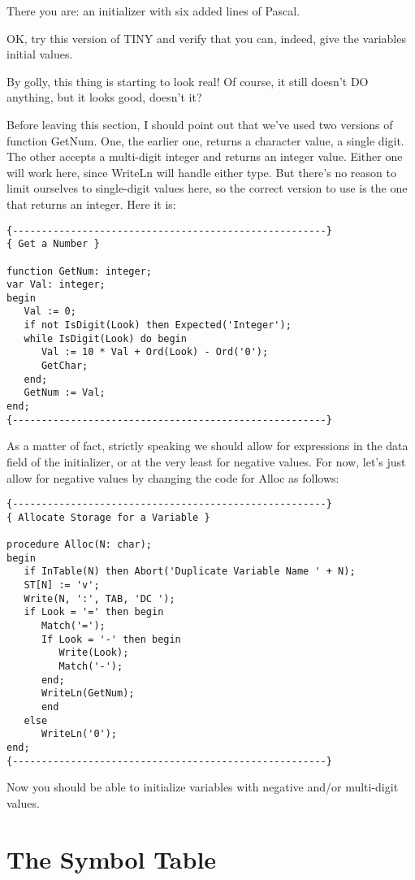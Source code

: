 There you are: an initializer with six added lines of Pascal.

OK, try this  version  of  TINY  and verify that you can, indeed, give the variables initial values.

By golly, this thing is starting to look  real!    Of  course, it still doesn't DO anything, but it looks good, doesn't it?

Before leaving this section, I should point out  that  we've used two versions of function GetNum. One, the earlier one, returns a character value, a single digit. The other accepts a multi-digit integer and returns an integer value. Either one will work here, since WriteLn will handle either type. But there's no  reason to limit ourselves  to  single-digit  values  here, so  the correct version to use is the one that returns an integer. Here it is:

\begin{verbatim}
{------------------------------------------------------}
{ Get a Number }

function GetNum: integer;
var Val: integer;
begin
   Val := 0;
   if not IsDigit(Look) then Expected('Integer');
   while IsDigit(Look) do begin
      Val := 10 * Val + Ord(Look) - Ord('0');
      GetChar;
   end;
   GetNum := Val;
end;
{------------------------------------------------------}
\end{verbatim}

As a matter  of  fact, strictly  speaking  we  should  allow for expressions in the data field of the initializer, or at  the very least  for  negative  values. For  now, let's  just  allow  for negative values by changing the code for Alloc as follows:

\begin{verbatim}
{------------------------------------------------------}
{ Allocate Storage for a Variable }

procedure Alloc(N: char);
begin
   if InTable(N) then Abort('Duplicate Variable Name ' + N);
   ST[N] := 'v';
   Write(N, ':', TAB, 'DC ');
   if Look = '=' then begin
      Match('=');
      If Look = '-' then begin
         Write(Look);
         Match('-');
      end;
      WriteLn(GetNum);
      end
   else
      WriteLn('0');
end;
{------------------------------------------------------}
\end{verbatim}

Now  you should be able to  initialize  variables  with  negative and/or multi-digit values.

\section{The Symbol Table}


